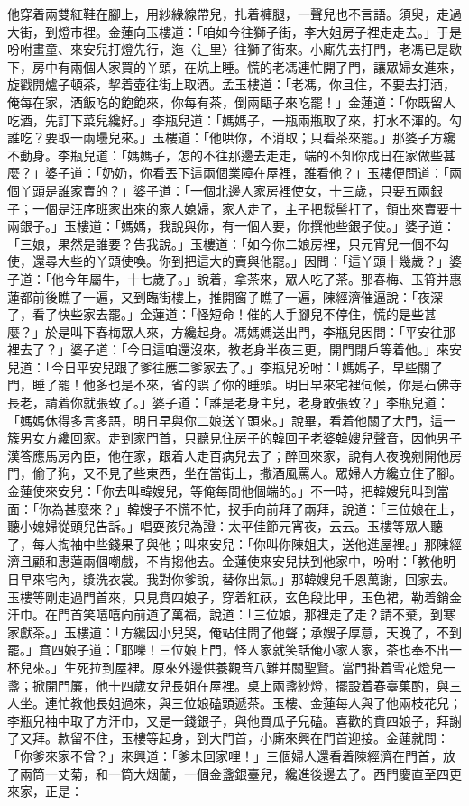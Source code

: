 他穿着兩雙紅鞋在腳上，用紗綠線帶兒，扎着褲腿，一聲兒也不言語。須臾，走過大街，到燈市裡。金蓮向玉樓道：「咱如今往獅子街，李大姐房子裡走走去。」于是吩咐畫童、來安兒打燈先行，迤〈辶里〉往獅子街來。小廝先去打門，老馮已是歇下，房中有兩個人家買的丫頭，在炕上睡。慌的老馮連忙開了門，讓眾婦女進來，旋戳開爐子頓茶，挈着壺往街上取酒。孟玉樓道：「老馮，你且住，不要去打酒，俺每在家，酒飯吃的飽飽來，你每有茶，倒兩甌子來吃罷！」金蓮道：「你既留人吃酒，先訂下菜兒纔好。」李瓶兒道：「媽媽子，一瓶兩瓶取了來，打水不渾的。勾誰吃？要取一兩壜兒來。」玉樓道：「他哄你，不消取；只看茶來罷。」那婆子方纔不動身。李瓶兒道：「媽媽子，怎的不往那邊去走走，端的不知你成日在家做些甚麼？」婆子道：「奶奶，你看丟下這兩個業障在屋裡，誰看他？」玉樓便問道：「兩個丫頭是誰家賣的？」婆子道：「一個北邊人家房裡使女，十三歲，只要五兩銀子；一個是汪序班家出來的家人媳婦，家人走了，主子把䯼髻打了，領出來賣要十兩銀子。」玉樓道：「媽媽，我說與你，有一個人要，你撰他些銀子使。」婆子道：「三娘，果然是誰要？告我說。」玉樓道：「如今你二娘房裡，只元宵兒一個不勾使，還尋大些的丫頭使喚。你到把這大的賣與他罷。」因問：「這丫頭十幾歲？」婆子道：「他今年屬牛，十七歲了。」說着，拿茶來，眾人吃了茶。那春梅、玉筲并惠蓮都前後瞧了一遍，又到臨街樓上，推開窗子瞧了一遍，陳經濟催逼說：「夜深了，看了快些家去罷。」金蓮道：「怪短命！催的人手腳兒不停住，慌的是些甚麼？」於是叫下春梅眾人來，方纔起身。馮媽媽送出門，李瓶兒因問：「平安往那裡去了？」婆子道：「今日這咱還沒來，教老身半夜三更，開門閉戶等着他。」來安兒道：「今日平安兒跟了爹往應二爹家去了。」李瓶兒吩咐：「媽媽子，早些關了門，睡了罷！他多也是不來，省的誤了你的睡頭。明日早來宅裡伺候，你是石佛寺長老，請着你就張致了。」婆子道：「誰是老身主兒，老身敢張致？」李瓶兒道：「媽媽休得多言多語，明日早與你二娘送丫頭來。」說畢，看着他關了大門，這一簇男女方纔回家。走到家門首，只聽見住房子的韓回子老婆韓嫂兒聲音，因他男子漢答應馬房內臣，他在家，跟着人走百病兒去了；醉回來家，說有人夜晚剜開他房門，偷了狗，又不見了些東西，坐在當街上，撒酒風罵人。眾婦人方纔立住了腳。金蓮使來安兒：「你去叫韓嫂兒，等俺每問他個端的。」不一時，把韓嫂兒叫到當面：「你為甚麼來？」韓嫂子不慌不忙，扠手向前拜了兩拜，說道：「三位娘在上，聽小媳婦從頭兒告訴。」唱耍孩兒為證：太平佳節元宵夜，云云。玉樓等眾人聽了，每人掏袖中些錢果子與他；叫來安兒：「你叫你陳姐夫，送他進屋裡。」那陳經濟且顧和惠蓮兩個嘲戲，不肯搊他去。金蓮使來安兒扶到他家中，吩咐：「教他明日早來宅內，漿洗衣裳。我對你爹說，替你出氣。」那韓嫂兒千恩萬謝，回家去。玉樓等剛走過門首來，只見賁四娘子，穿着紅祆，玄色段比甲，玉色裙，勒着銷金汗巾。在門首笑嘻嘻向前道了萬福，說道：「三位娘，那裡走了走？請不棄，到寒家獻茶。」玉樓道：「方纔因小兒哭，俺站住問了他聲；承嫂子厚意，天晚了，不到罷。」賁四娘子道：「耶嚛！三位娘上門，怪人家就笑話俺小家人家，茶也奉不出一杯兒來。」生死拉到屋裡。原來外邊供養觀音八難并關聖賢。當門掛着雪花燈兒一盞；掀開門簾，他十四歲女兒長姐在屋裡。桌上兩盞紗燈，擺設着春臺菓酌，與三人坐。連忙教他長姐過來，與三位娘磕頭遞茶。玉樓、金蓮每人與了他兩枝花兒；李瓶兒袖中取了方汗巾，又是一錢銀子，與他買瓜子兒磕。喜歡的賁四娘子，拜謝了又拜。款留不住，玉樓等起身，到大門首，小廝來興在門首迎接。金蓮就問：「你爹來家不曾？」來興道：「爹未回家哩！」三個婦人還看着陳經濟在門首，放了兩筒一丈菊，和一筒大烟蘭，一個金盞銀臺兒，纔進後邊去了。西門慶直至四更來家，正是：

